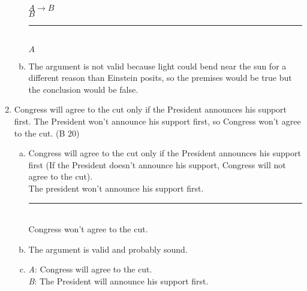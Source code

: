 \documentclass{article}
\begin{document}
\begin{enumerate}
\begin{enumerate}[(a)]
                        $A \to B$\\
                        $B$\\
                        \rule{5em}{.5pt}\\
                        $A$
                        \setcounter{enumii}{4}
                  \item The argument is not valid because light could bend near the sun for a different reason than Einstein posits, so the premises would be true but the conclusion would be false.
            \end{enumerate}
      \item Congress will agree to the cut only if the President announces his support first. The President won't announce his support first, so Congress won't agree to the cut. (B 20)
            \begin{enumerate}[(a)]
                  \item Congress will agree to the cut only if the President announces his support first (If the President doesn't announce his support, Congress will not agree to the cut).\\
                        The president won't announce his support first.\\
                        \rule{15em}{.5pt}\\
                        Congress won't agree to the cut.
                  \item The argument is valid and probably sound.
                  \item \textit{A}: Congress will agree to the cut.\\
                        \textit{B}: The President will announce his support first.\\


\end{enumerate}
\end{enumerate}
\end{document}
